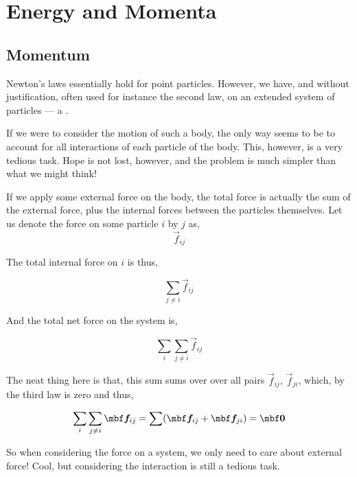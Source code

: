 \chapter{Energy and Momenta}

\margintoc


\section{Momentum}

Newton's laws essentially hold for point particles. However, we have, and without 
justification, often used for instance the second law, on an extended system of particles ---
a .

If we were to consider the motion of such a body, the only way seems to be 
to account for all interactions of each particle of the body. This, however, is a very tedious task.
Hope is not lost, however, and the problem is much simpler than what we might think!

If we apply some external force on the body, the total force is actually the sum of the external 
force, plus the internal forces between the particles themselves. Let us denote 
the force on some particle \(i\) by \(j\) as,
\[\vec{f}_{ij}\]


The total internal force on \(i\) is thus, 

\[\sum_{j \ne i} \vec{f}_{ij}\]

And the total net force on the system is,

\[\sum_{i}\sum_{j \ne i} \vec{f}_{ij}\]

The neat thing here is that, this sum sums over over all pairs \(\vec{f}_{ij}\), \(\vec{f}_{ji}\), which, by 
the third law is zero and thus, 

\begin{equation}
    \sum_{i}\sum_{j \ne i} \vec{f}_{ij} = \sum (\vec{f}_{ij} + \vec{f}_{ji}) = \oo
\end{equation}

So when considering the force on a system, we only need to care about external force! Cool, 
but considering the interaction is still a tedious task. 

